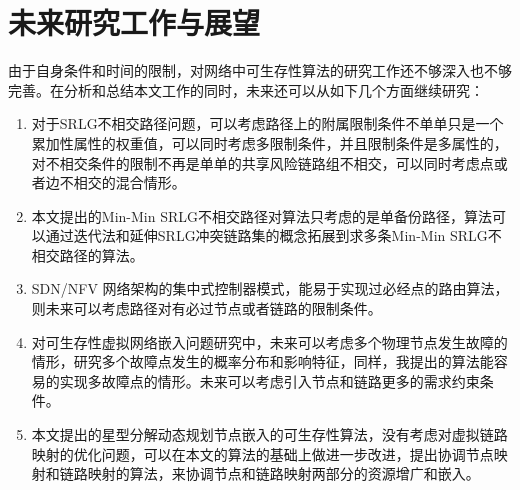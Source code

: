 \section{未来研究工作与展望}
由于自身条件和时间的限制，对网络中可生存性算法的研究工作还不够深入也不够完善。在分析和总结本文工作的同时，未来还可以从如下几个方面继续研究：
\begin{enumerate}
  \item 对于SRLG不相交路径问题，可以考虑路径上的附属限制条件不单单只是一个累加性属性的权重值，可以同时考虑多限制条件，并且限制条件是多属性的\cite{linchuang2011}，对不相交条件的限制不再是单单的共享风险链路组不相交，可以同时考虑点或者边不相交的混合情形。
  \item 本文提出的Min-Min SRLG不相交路径对算法只考虑的是单备份路径，算法可以通过迭代法和延伸SRLG冲突链路集的概念拓展到求多条Min-Min SRLG不相交路径的算法。
  \item SDN/NFV 网络架构的集中式控制器模式，能易于实现过必经点的路由算法，则未来可以考虑路径对有必过节点或者链路的限制条件。
  \item 对可生存性虚拟网络嵌入问题研究中，未来可以考虑多个物理节点发生故障的情形，研究多个故障点发生的概率分布和影响特征，同样，我提出的算法能容易的实现多故障点的情形。未来可以考虑引入节点和链路更多的需求约束条件。
  \item 本文提出的星型分解动态规划节点嵌入的可生存性算法，没有考虑对虚拟链路映射的优化问题，可以在本文的算法的基础上做进一步改进，提出协调节点映射和链路映射的算法，来协调节点和链路映射两部分的资源增广和嵌入。
\end{enumerate}

